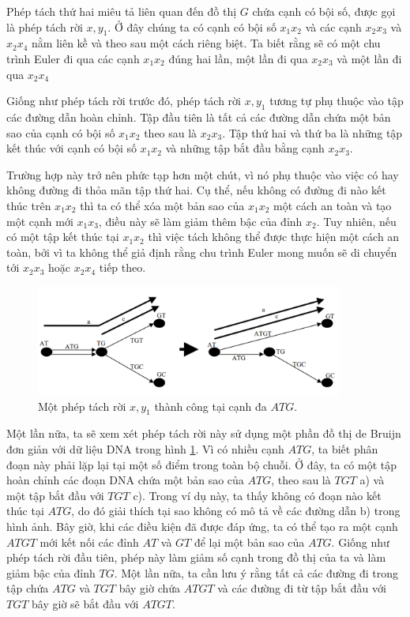 \documentclass[14pt, a4paper]{article}
\numberwithin{equation}{section}
\numberwithin{figure}{section}
\numberwithin{dl}{section}
\numberwithin{md}{section}
\numberwithin{bd}{section}
\numberwithin{dn}{section}
\numberwithin{hq}{section}
\begin{document}
    Phép tách thứ hai miêu tả liên quan đến đồ thị $G$ chứa cạnh có bội số, được gọi là phép tách rời $x, y_1$.
    Ở đây chúng ta có cạnh có bội số $x_1 x_2$ và các cạnh $x_2 x_3$ và $x_2 x_4$ nằm liên kề và theo sau một cách riêng biệt.
    Ta biết rằng sẽ có một chu trình Euler đi qua các cạnh $x_1 x_2$ đúng hai lần, một lần đi qua $x_2 x_3$ và một lần đi qua $x_2 x_4$

    Giống như phép tách rời trước đó, phép tách rời $x, y_1$ tương tự phụ thuộc vào tập các đường dẫn hoàn chỉnh.
    Tập đầu tiên là tất cả các đường dẫn chứa một bản sao của cạnh có bội số $x_1 x_2$ theo sau là $x_2 x_3$.
    Tập thứ hai và thứ ba là những tập kết thúc với cạnh có bội số $x_1 x_2$ và những tập bắt đầu bằng cạnh $x_2 x_3$.

    Trường hợp này trở nên phức tạp hơn một chút, vì nó phụ thuộc vào việc có hay không đường đi thỏa mãn tập thứ hai.
    Cụ thể, nếu không có đường đi nào kết thúc trên $x_1 x_2$ thì ta có thể xóa một bản sao của $x_1 x_2$ một cách an toàn và tạo một cạnh mới $x_1 x_3$, điều này sẽ làm giảm thêm bậc của đỉnh $x_2$.
    Tuy nhiên, nếu có một tập kết thúc tại $x_1 x_2$ thì việc tách không thể được thực hiện một cách an toàn, bởi vì ta không thể giả định rằng chu trình Euler mong muốn sẽ di chuyển tới $x_2 x_3$ hoặc $x_2 x_4$ tiếp theo.

    \begin{figure}[h!]
        \centering
        \includegraphics[width=0.9\textwidth]{7.png}
        \caption{Một phép tách rời $x, y_1$ thành công tại cạnh đa $ATG$.}
        \label{fig:7}
    \end{figure}

    Một lần nữa, ta sẽ xem xét phép tách rời này sử dụng một phần đồ thị de Bruijn đơn giản với dữ liệu DNA trong hình \ref{fig:7}.
    Vì có nhiều cạnh $ATG$, ta biết phân đoạn này phải lặp lại tại một số điểm trong toàn bộ chuỗi. Ở đây, ta có một tập hoàn chỉnh các đoạn DNA chứa một bản sao của $ATG$, theo sau là $TGT$ a) và một tập bắt đầu với $TGT$ c).
    Trong ví dụ này, ta thấy không có đoạn nào kết thúc tại $ATG$, do đó giải thích tại sao không có mô tả về các đường dẫn b) trong hình ảnh.
    Bây giờ, khi các điều kiện đã được đáp ứng, ta có thể tạo ra một cạnh $ATGT$ mới kết nối các đỉnh $AT$ và $GT$ để lại một bản sao của $ATG$.
    Giống như phép tách rời đầu tiên, phép này làm giảm số cạnh  trong đồ thị của ta và làm giảm bậc của đỉnh $TG$.
    Một lần nữa, ta cần lưu ý rằng tất cả các đường đi trong tập chứa $ATG$ và $TGT$ bây giờ chứa $ATGT$ và các đường đi từ tập bắt đầu với $TGT$ bây giờ sẽ bắt đầu với $ATGT$.
\end{document}
